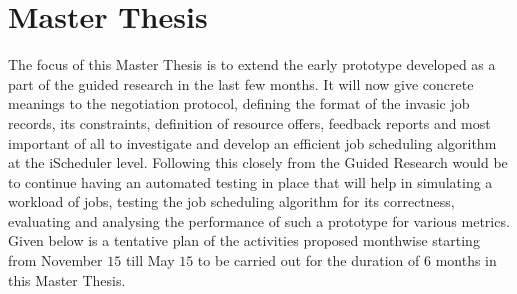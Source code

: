 \section{Master Thesis}
The focus of this Master Thesis is to extend the early prototype developed as a part of the guided research in the last few months. It will now give concrete meanings to the negotiation protocol, defining the format of the invasic job records, its constraints, definition of resource offers, feedback reports and most important of all to investigate and develop an efficient job scheduling algorithm at the iScheduler level. Following this closely from the Guided Research would be to continue having an automated testing in place that will help in simulating a workload of jobs, testing the job scheduling algorithm for its correctness, evaluating and analysing the performance of such a prototype for various metrics. Given below is a tentative plan of the activities proposed monthwise starting from November $15$ till May $15$ to be carried out for the duration of 6 months in this Master Thesis.\par
